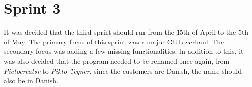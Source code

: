 \chapter{Sprint 3}
It was decided that the third sprint should run from the 15th of April to the 5th of May.
The primary focus of this sprint was a major GUI overhaul.
The secondary focus was adding a few missing functionalities.
In addition to this, it was also decided that the program needed to be renamed once again, from \textit{Pictocreator} to \textit{Pikto Tegner}, since the customers are Danish, the name should also be in Danish.





